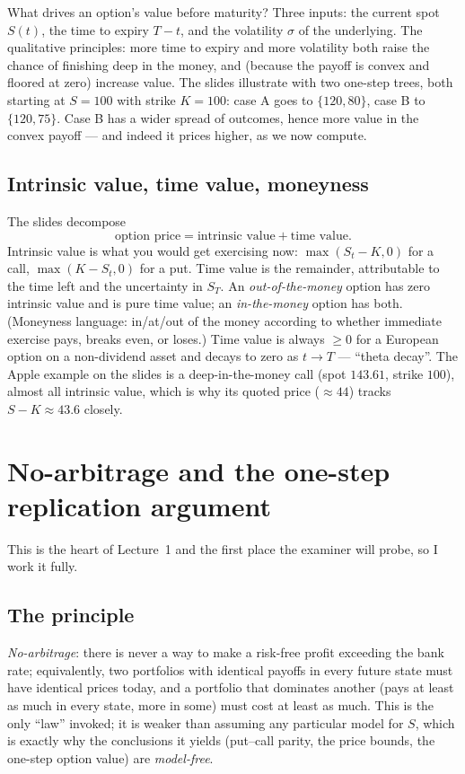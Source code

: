 \documentclass[11pt]{article}
\begin{document}
What drives an option's value before maturity? Three inputs: the current spot $S(t)$, the time to expiry $T-t$, and the volatility $\sigma$ of the underlying. The qualitative principles: more time to expiry and more volatility both raise the chance of finishing deep in the money, and (because the payoff is convex and floored at zero) increase value. The slides illustrate with two one-step trees, both starting at $S=100$ with strike $K=100$: case A goes to $\{120,80\}$, case B to $\{120,75\}$. Case B has a wider spread of outcomes, hence more value in the convex payoff --- and indeed it prices higher, as we now compute.

\subsection{Intrinsic value, time value, moneyness}

The slides decompose
\[
\text{option price}=\text{intrinsic value}+\text{time value}.
\]
Intrinsic value is what you would get exercising now: $\max(S_t-K,0)$ for a call, $\max(K-S_t,0)$ for a put. Time value is the remainder, attributable to the time left and the uncertainty in $S_T$. An \emph{out-of-the-money} option has zero intrinsic value and is pure time value; an \emph{in-the-money} option has both. (Moneyness language: in/at/out of the money according to whether immediate exercise pays, breaks even, or loses.) Time value is always $\ge 0$ for a European option on a non-dividend asset and decays to zero as $t\to T$ --- ``theta decay''. The Apple example on the slides is a deep-in-the-money call (spot $143.61$, strike $100$), almost all intrinsic value, which is why its quoted price ($\approx 44$) tracks $S-K\approx 43.6$ closely.

\section{No-arbitrage and the one-step replication argument}

This is the heart of Lecture~1 and the first place the examiner will probe, so I work it fully.

\subsection{The principle}

\emph{No-arbitrage}: there is never a way to make a risk-free profit exceeding the bank rate; equivalently, two portfolios with identical payoffs in every future state must have identical prices today, and a portfolio that dominates another (pays at least as much in every state, more in some) must cost at least as much. This is the only ``law'' invoked; it is weaker than assuming any particular model for $S$, which is exactly why the conclusions it yields (put--call parity, the price bounds, the one-step option value) are \emph{model-free}.
\end{document}
